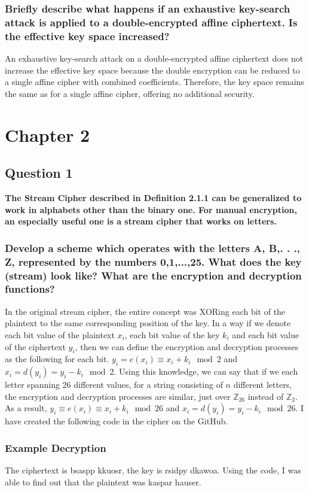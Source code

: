 \documentclass[titlepage]{article}
\begin{document}
{{\subsubsection{Briefly describe what happens if an exhaustive key-search attack is applied to a
double-encrypted affine ciphertext. Is the effective key space increased?}
{
An exhaustive key-search attack on a double-encrypted affine ciphertext does not increase the effective key space because the double encryption can be reduced to a single affine cipher with combined coefficients. Therefore, the key space remains the same as for a single affine cipher, offering no additional security.
}
}
}
\clearpage
\section{Chapter 2}
{
\subsection{Question 1}
{
\textbf{The Stream Cipher described in Definition 2.1.1 can be generalized to work in alphabets other than the binary one. For manual encryption, an especially useful one is a stream cipher that works on letters.}
\subsubsection{Develop a scheme which operates with the letters A, B,. . ., Z, represented by the numbers 0,1,...,25. What does the key (stream) look like? What are the encryption and decryption functions?}
{
In the original stream cipher, the entire concept was XORing each bit of the plaintext to the same corresponding position of the key. In a way if we denote each bit value of the plaintext \(x_i\), each bit value of the key \(k_i\) and each bit value of the ciphertext \(y_i\), then we can define the encryption and decryption processes as the following for each bit. \(y_i = e(x_i) \equiv x_i + k_i \mod 2\) and \(x_i = d(y_i) = y_i - k_i \mod 2\). Using this knowledge, we can say that if we each letter spanning 26 different values, for a string consisting of \(n\) different letters, the encryption and decryption processes are similar, just over \(\mathbb{Z}_{26}\) instead of \(\mathbb{Z}_{2}\). As a result, \(y_i \equiv e(x_i) \equiv x_i + k_i \mod 26\) and \(x_i = d(y_i) = y_i - k_i \mod 26\). I have created the following code in the cipher on the GitHub.
}
\subsubsection{Example Decryption}
{
The ciphertext is bsaspp kkuosr, the key is rsidpy dkawoa. Using the code, I was able to find out that the plaintext was kaspar hauser. 
}
}
}
\end{document}
